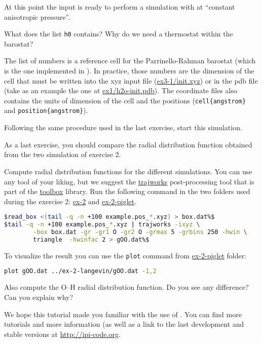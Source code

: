 \documentclass{article}
\begin{document}
\begin{Exercise}[label={inputs},title={PIMD-NPT simulation of ice}]
At this point the input is ready to perform a simulation with at
``constant anisotropic pressure''.

\Question
What does the list \texttt{h0} contains? Why do we need a thermostat
within the barostat?

The list of numbers is a reference cell for the Parrinello-Rahman
barostat (which is the one implemented in \ipi). In practice, those
numbers are the dimension of the cell that must be written into the xyz
input file (\url{ex3-1/init.xyz}) or in the pdb file (take as an
example the one at \url{ex1/h2o-init.pdb}). The coordinate files
also contains the units of dimension of the cell and the positions
(\texttt{cell\{angstrom\}} and \texttt{position\{angstrom\}}).

\Question
Following the same procedure used in the last exercise, start this
simulation.

\end{Exercise}

\begin{Exercise}[label={inputs},title={Radial distribution function comparison}]
As a last exercise, you should compare the radial distribution
function obtained from the two simulation of exercise 2.

\Question
Compute radial distribution functions for the different simulations. You
can use any tool of your liking, but we suggest the \url{trajworks}
post-processing tool that is part of the \url{toolbox} library.
Run the following command in the two folders used during the exercise
2: \url{ex-2} and \url{ex-2-piglet}.
\begin{lstlisting}[language=bash]
$read_box <(tail -q -n +100 example.pos_*.xyz) > box.dat%$
$tail -q -n +100 example.pos_*.xyz | trajworks -ixyz \
        -box box.dat -gr -gr1 O -gr2 O -grmax 5 -grbins 250 -hwin \
        triangle  -hwinfac 2 > gOO.dat%$
\end{lstlisting}

To visualize the result you can use the \texttt{plot} command from
\url{ex-2-piglet} folder:
\begin{lstlisting}[language=bash]
plot gOO.dat ../ex-2-langevin/gOO.dat -1,2
\end{lstlisting}
Also compute the O--H radial distribution function.
Do you see any difference? Can you explain why?

\end{Exercise}

We hope this tutorial made you familiar with the use of \ipi. You
can find more tutorials and more information (as well as a link to the
last development and stable versions at \url{http://ipi-code.org}.
\end{document}
